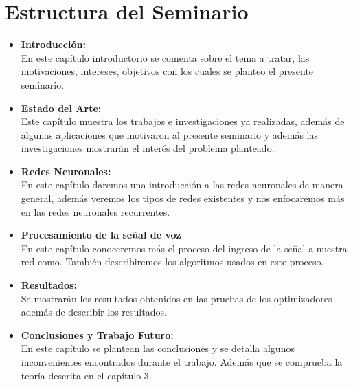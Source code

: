 \section{Estructura del Seminario}


\begin{itemize}

\item \textbf{Introducción:} \\
En este capítulo introductorio se comenta sobre el tema a tratar, las motivaciones, intereses, objetivos con los cuales se planteo el presente seminario.

\item \textbf{Estado del Arte:} \\
Este capítulo muestra los trabajos e investigaciones ya realizadas, además de algunas aplicaciones que motivaron al presente seminario y además las investigaciones mostrarán el interés del problema planteado.

\item \textbf{Redes Neuronales:} \\
En este capítulo daremos una introducción a las redes neuronales de manera general, además veremos los tipos de redes existentes y nos enfocaremos más en las redes neuronales recurrentes.
\item \textbf{Procesamiento de la señal de voz} \\
En este capítulo conoceremos más el proceso del ingreso de la señal a nuestra red como. También describiremos los algoritmos usados en este proceso.
\item \textbf{Resultados:} \\
Se mostrarán los resultados obtenidos en las pruebas de los optimizadores además de describir los resultados.
\item \textbf{Conclusiones y Trabajo Futuro:} \\
En este capítulo se plantean las conclusiones y se detalla algunos inconvenientes encontrados durante el trabajo. Además que se comprueba la teoría descrita en el capítulo 3.


\end{itemize}



